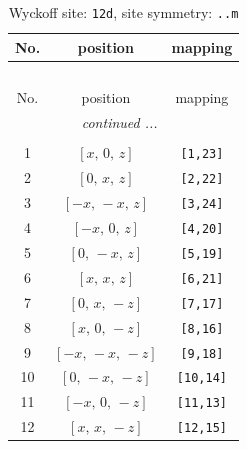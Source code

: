\documentclass[fleqn,8pt]{jsarticle}
\begin{document}
\renewcommand{\arraystretch}{1.2}
\begin{longtable}{ccc}
\caption{Wyckoff site: {\tt 12d}, site symmetry: {\tt ..m}}
 \\
 \hline \hline
No. & position & mapping \\ \hline \endfirsthead

\multicolumn{2}{l}{\tablename\ \thetable{}} \\
 \hline \hline
No. & position & mapping \\ \hline \endhead

 \hline \hline
\multicolumn{2}{r}{\footnotesize\it continued ...} \\ \endfoot

 \hline \hline
\multicolumn{2}{r}{} \\ \endlastfoot

1 & $\left[ x,\, 0,\, z \right]$ & {\tt [1,23]} \\ \hline
2 & $\left[ 0,\, x,\, z \right]$ & {\tt [2,22]} \\ \hline
3 & $\left[ - x,\, - x,\, z \right]$ & {\tt [3,24]} \\ \hline
4 & $\left[ - x,\, 0,\, z \right]$ & {\tt [4,20]} \\ \hline
5 & $\left[ 0,\, - x,\, z \right]$ & {\tt [5,19]} \\ \hline
6 & $\left[ x,\, x,\, z \right]$ & {\tt [6,21]} \\ \hline
7 & $\left[ 0,\, x,\, - z \right]$ & {\tt [7,17]} \\ \hline
8 & $\left[ x,\, 0,\, - z \right]$ & {\tt [8,16]} \\ \hline
9 & $\left[ - x,\, - x,\, - z \right]$ & {\tt [9,18]} \\ \hline
10 & $\left[ 0,\, - x,\, - z \right]$ & {\tt [10,14]} \\ \hline
11 & $\left[ - x,\, 0,\, - z \right]$ & {\tt [11,13]} \\ \hline
12 & $\left[ x,\, x,\, - z \right]$ & {\tt [12,15]} \\
\end{longtable}
\renewcommand{\arraystretch}{1.2}
\end{document}
